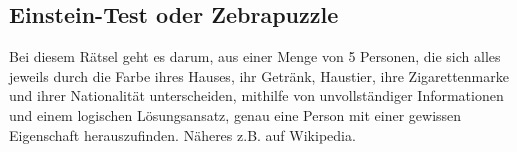 \subsection{Einstein-Test oder Zebrapuzzle}

Bei diesem Rätsel geht es darum, aus einer Menge von 5 Personen, die sich alles jeweils durch die Farbe ihres Hauses, ihr Getränk, Haustier, ihre Zigarettenmarke und ihrer Nationalität unterscheiden, mithilfe von unvollständiger Informationen und einem logischen Lösungsansatz, genau eine Person mit einer gewissen Eigenschaft herauszufinden. Näheres z.B. auf Wikipedia.


